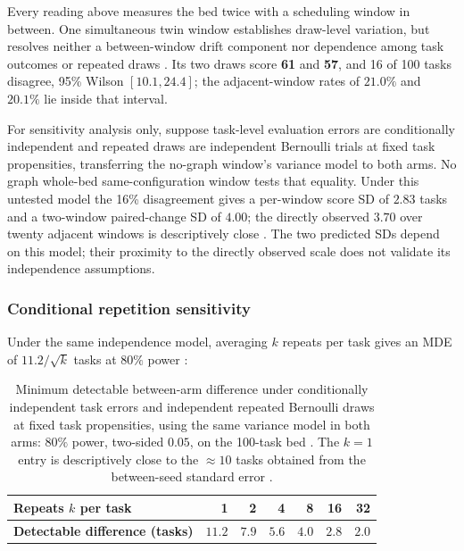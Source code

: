 Every reading above measures the bed twice with a scheduling window in
between. One simultaneous twin window establishes draw-level variation, but
resolves neither a between-window drift component nor dependence among task
outcomes or repeated draws . Its two draws score \textbf{61} and
\textbf{57}, and 16 of 100 tasks disagree, 95\% Wilson $[10.1,24.4]$;
the adjacent-window rates of $21.0\%$  and $20.1\%$  lie inside
that interval.

For sensitivity analysis only, suppose task-level evaluation errors are
conditionally independent and repeated draws are independent Bernoulli trials
at fixed task propensities, transferring the no-graph window's variance model
to both arms. No graph whole-bed same-configuration window tests that equality.
Under this untested model the 16\% disagreement gives a per-window score SD of
$2.83$ tasks and a two-window paired-change SD of $4.00$; the directly
observed $3.70$ over twenty adjacent windows is descriptively close
. The two predicted SDs depend on this model; their proximity
to the directly observed scale does not validate its independence assumptions.

\subsubsection*{Conditional repetition sensitivity}

Under the same independence model, averaging $k$ repeats per task gives
an MDE of $11.2/\sqrt{k}$ tasks at $80\%$ power :

\begin{table}[htbp]
\centering\small
\setlength{\tabcolsep}{8pt}
\begin{tabular}{@{}lrrrrrr@{}}
\toprule
\textbf{Repeats $k$ per task} & 1 & 2 & 4 & 8 & 16 & 32 \\
\midrule
\textbf{Detectable difference (tasks)} & $11.2$ & $7.9$ & $5.6$ & $4.0$
  & $2.8$ & $2.0$ \\
\bottomrule
\end{tabular}
\caption[Model-conditional repetition sensitivity]{Minimum detectable
between-arm difference under conditionally independent task errors and
independent repeated Bernoulli draws at fixed task propensities, using the same
variance model in both arms: $80\%$ power, two-sided $0.05$, on the 100-task
bed . The $k{=}1$ entry is descriptively close to the ${\approx}10$
tasks obtained from the between-seed standard error .}
\label{tab:resolution}
\end{table}

